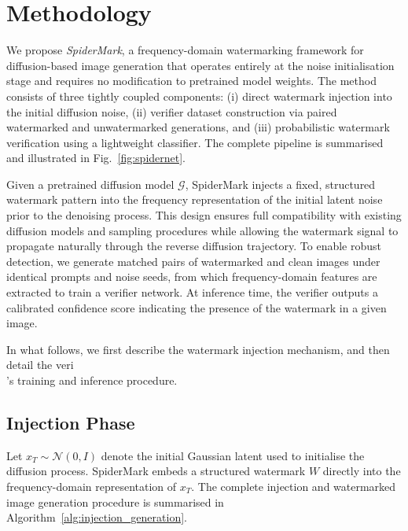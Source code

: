 

\section{Methodology}

We propose \textit{SpiderMark}, a frequency-domain watermarking framework for diffusion-based image generation that operates entirely at the noise initialisation stage and requires no modification to pretrained model weights. 
The method consists of three tightly coupled components: (i) direct watermark injection into the initial diffusion noise, (ii) verifier dataset construction via paired watermarked and unwatermarked generations, and (iii) probabilistic watermark verification using a lightweight classifier. 
The complete pipeline is summarised and illustrated in Fig.~\ref{fig:spidernet}.


Given a pretrained diffusion model $\mathcal{G}$, SpiderMark injects a fixed, structured watermark pattern into the frequency representation of the initial latent noise prior to the denoising process. 
This design ensures full compatibility with existing diffusion models and sampling procedures while allowing the watermark signal to propagate naturally through the reverse diffusion trajectory.
To enable robust detection, we generate matched pairs of watermarked and clean images under identical prompts and noise seeds, from which frequency-domain features are extracted to train a verifier network.
At inference time, the verifier outputs a calibrated confidence score indicating the presence of the watermark in a given image.

In what follows, we first describe the watermark injection mechanism, and then detail the veri\\\fier’s training and inference procedure.


\subsection{Injection Phase}
Let \(x_T \sim \mathcal{N}(0,I)\) denote the initial Gaussian latent used to initialise the diffusion process.
SpiderMark embeds a structured watermark \(W\) directly into the frequency-domain representation of \(x_T\).
The complete injection and watermarked image generation procedure is summarised in Algorithm~\ref{alg:injection_generation}.

